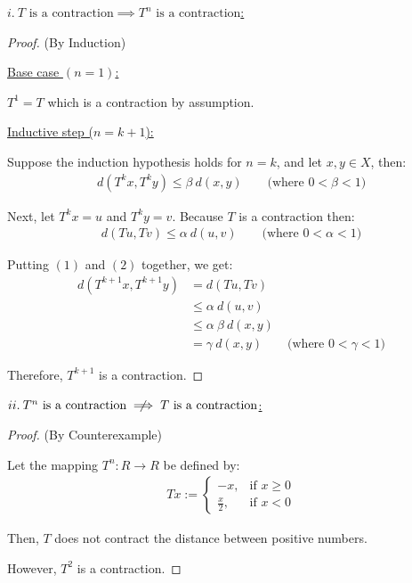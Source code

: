 \documentclass{article}
\begin{document}
\underline{$i. \: T \text{ is a contraction} \implies T^n \text{ is a contraction}$:}
\begin{proof}(By Induction)

  \underline{Base case $(n = 1)$:}

  $T^1 = T$ which is a contraction by assumption.
  \newline

  \underline{Inductive step ($n = k+1$):}

  Suppose the induction hypothesis holds for $n = k$, and let $x, y \in X$, then:
  \begin{align}
    d(T^k x, T^k y) \leq \beta \: d(x, y) \qquad \text{(where $0 < \beta < 1$)}
  \end{align}

  Next, let $T^kx = u$ and $T^k y = v$. Because $T$ is a contraction then:
  \begin{align}
    d(Tu, Tv) \leq \alpha \: d(u, v) \qquad \text{(where $0 < \alpha < 1$)}
  \end{align} 

  Putting $(1)$ and $(2)$ together, we get: 
  \begin{align*}
    d(T^{k+1}x, T^{k+1}y) &= d(Tu, Tv) \\
    &\leq \alpha \: d(u, v) \\
    &\leq \alpha \: \beta \: d(x,y) \\
    &= \gamma \: d(x,y) \qquad \text{(where $0 < \gamma < 1$)}
  \end{align*}

  Therefore, $T^{k+1}$ is a contraction.

\end{proof}

\noindent
\underline{$ii. \: T^n \text{ is a contraction} \centernot\implies T \text{ is a contraction}$:}
\begin{proof}(By Counterexample)
  $ $
  
  Let the mapping $T^n: R \longrightarrow R$ be defined by:
  \begin{align*}
    Tx := \begin{cases}
      -x, &\text{if } x \geq 0 \\
      \frac{x}{2}, &\text{if } x < 0
    \end{cases}
  \end{align*}

  Then, $T$ does not contract the distance between positive numbers.

  However, $T^2$ is a contraction.

\end{proof}
\end{document}
